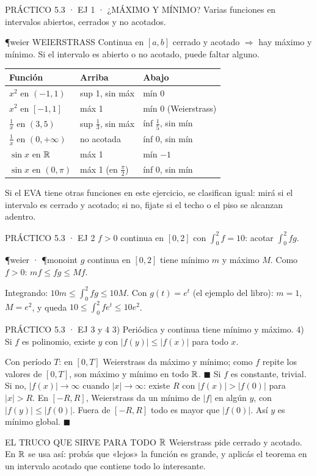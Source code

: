 \begin{enunciado}{PRÁCTICO 5.3 · EJ 1 · ¿MÁXIMO Y MÍNIMO?}
Varias funciones en intervalos abiertos, cerrados y no acotados.
\end{enunciado}
\begin{uso}{\P{weier} WEIERSTRASS}
Continua en $[a,b]$ cerrado y acotado $\Rightarrow$ hay máximo y mínimo. Si el intervalo es abierto o no acotado, puede faltar alguno.
\end{uso}
\begin{center}\small
\begin{tabular}{@{}lll@{}}\toprule
Función & Arriba & Abajo\\\midrule
$x^2$ en $(-1,1)$ & sup 1, sin máx & mín 0\\
$x^2$ en $[-1,1]$ & máx 1 & mín 0 (Weierstrass)\\
$\frac1x$ en $(3,5)$ & sup $\frac13$, sin máx & ínf $\frac15$, sin mín\\
$\frac1x$ en $(0,+\infty)$ & no acotada & ínf 0, sin mín\\
$\sin x$ en $\mathbb{R}$ & máx 1 & mín $-1$\\
$\sin x$ en $(0,\pi)$ & máx 1 (en $\frac\pi2$) & ínf 0, sin mín\\\bottomrule
\end{tabular}
\end{center}
\begin{falta}
Si el EVA tiene otras funciones en este ejercicio, se clasifican igual: mirá si el intervalo es cerrado y acotado; si no, fijate si el techo o el piso se alcanzan adentro.
\end{falta}

\begin{enunciado}{PRÁCTICO 5.3 · EJ 2}
$f>0$ continua en $[0,2]$ con $\int_0^2f=10$: acotar $\int_0^2fg$.
\end{enunciado}
\begin{uso}{\P{weier} · \P{monoint}}
$g$ continua en $[0,2]$ tiene mínimo $m$ y máximo $M$. Como $f>0$: $mf\le fg\le Mf$.
\end{uso}
Integrando: $10m\le\int_0^2fg\le10M$. Con $g(t)=e^t$ (el ejemplo del libro): $m=1$, $M=e^2$, y queda $10\le\int_0^2fe^t\le10e^2$.

\begin{enunciado}{PRÁCTICO 5.3 · EJ 3 y 4}
3) Periódica y continua tiene mínimo y máximo. 4) Si $f$ es polinomio, existe $y$ con $|f(y)|\le|f(x)|$ para todo $x$.
\end{enunciado}
Con período $T$: en $[0,T]$ Weierstrass da máximo y mínimo; como $f$ repite los valores de $[0,T]$, son máximo y mínimo en todo $\mathbb{R}$. $\blacksquare$
Si $f$ es constante, trivial. Si no, $|f(x)|\to\infty$ cuando $|x|\to\infty$: existe $R$ con $|f(x)|>|f(0)|$ para $|x|>R$. En $[-R,R]$, Weierstrass da un mínimo de $|f|$ en algún $y$, con $|f(y)|\le|f(0)|$. Fuera de $[-R,R]$ todo es mayor que $|f(0)|$. Así $y$ es mínimo global. $\blacksquare$
\begin{tip}{EL TRUCO QUE SIRVE PARA TODO $\mathbb{R}$}
Weierstrass pide cerrado y acotado. En $\mathbb{R}$ se usa así: probás que «lejos» la función es grande, y aplicás el teorema en un intervalo acotado que contiene todo lo interesante.
\end{tip}

